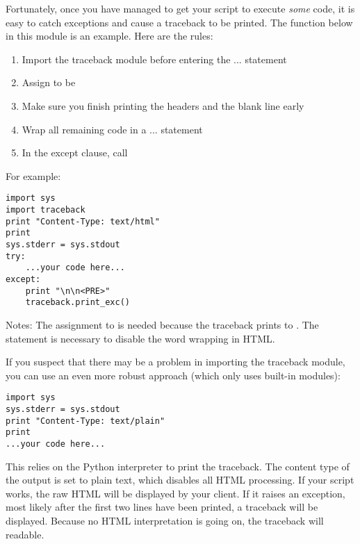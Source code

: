 Fortunately, once you have managed to get your script to execute
\emph{some} code, it is easy to catch exceptions and cause a traceback
to be printed.  The  function below in this module is
an example.  Here are the rules:

\begin{enumerate}
\item Import the traceback module before entering the 
   ...  statement

\item Assign  to be 

\item Make sure you finish printing the headers and the blank line
   early

\item Wrap all remaining code in a  ... 
   statement

\item In the except clause, call 
\end{enumerate}

For example:

\begin{verbatim}
import sys
import traceback
print "Content-Type: text/html"
print
sys.stderr = sys.stdout
try:
    ...your code here...
except:
    print "\n\n<PRE>"
    traceback.print_exc()
\end{verbatim}

Notes: The assignment to  is needed because the
traceback prints to .
The  statement is necessary to
disable the word wrapping in HTML.

If you suspect that there may be a problem in importing the traceback
module, you can use an even more robust approach (which only uses
built-in modules):

\begin{verbatim}
import sys
sys.stderr = sys.stdout
print "Content-Type: text/plain"
print
...your code here...
\end{verbatim}

This relies on the Python interpreter to print the traceback.  The
content type of the output is set to plain text, which disables all
HTML processing.  If your script works, the raw HTML will be displayed
by your client.  If it raises an exception, most likely after the
first two lines have been printed, a traceback will be displayed.
Because no HTML interpretation is going on, the traceback will
readable.


